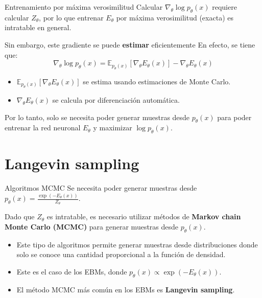 \documentclass{beamer}
\begin{document}
\begin{frame}{Entrenamiento por máxima verosimilitud}
    Calcular $\nabla_\theta \log p_\theta(x)$ requiere calcular $Z_\theta$, por lo que entrenar $E_\theta$ por máxima verosimilitud (exacta) es intratable en general.

    Sin embargo, este gradiente se puede \textbf{estimar} eficientemente En efecto, se tiene que:
    \begin{equation*}
        \nabla_\theta\log p_\theta(x)=\mathbb{E}_{p_\theta(x)}\left[\nabla_\theta E_\theta(x)\right]-\nabla_\theta E_\theta(x)
    \end{equation*}
    \vspace{-0.8cm}
    \begin{itemize}
        \item $\mathbb{E}_{p_\theta(x)}\left[\nabla_\theta E_\theta(x)\right]$ se estima usando estimaciones de Monte Carlo.
        \item $\nabla_\theta E_\theta(x)$ se calcula por diferenciación automática.
    \end{itemize}
    Por lo tanto, solo se necesita poder generar muestras desde $p_\theta(x)$ para poder entrenar la red neuronal $E_\theta$ y maximizar $\log p_\theta(x)$.
\end{frame}

\section{Langevin sampling}

\begin{frame}{Algoritmos MCMC}
    Se necesita poder generar muestras desde $p_\theta(x)=\frac{\exp\left(-E_\theta(x)\right)}{Z_\theta}$.

    Dado que $Z_\theta$ es intratable, es necesario utilizar métodos de \textbf{Markov chain Monte Carlo (MCMC)} para generar muestras desde $p_\theta(x)$.
    \begin{itemize}
        \item Este tipo de algoritmos permite generar muestras desde distribuciones donde solo se conoce una cantidad proporcional a la función de densidad.
        \item Este es el caso de los EBMs, donde $p_\theta(x)\propto\exp\left(-E_\theta(x)\right)$.
        \item El método MCMC más común en los EBMs es \textbf{Langevin sampling}.
    \end{itemize}
\end{frame}
\end{document}
